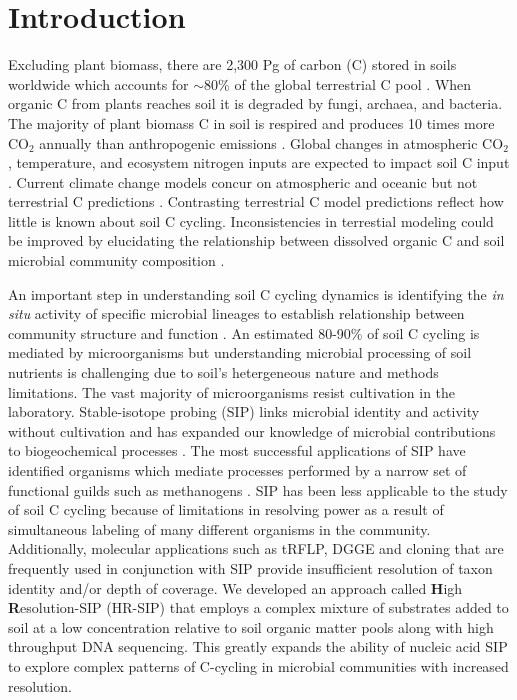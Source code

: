 \section{Introduction}
Excluding plant biomass, there are 2,300 Pg of carbon (C) stored in soils
worldwide which accounts for $\sim$80\% of the global terrestrial C pool
\citep{Amundson_2001,BATJES_1996}. When organic C from plants reaches soil it
is degraded by fungi, archaea, and bacteria.  The majority of plant biomass
C in soil is respired and produces 10 times more CO$_{2}$ annually than
anthropogenic emissions \citep{chapin2002principles}. Global
changes in atmospheric CO$_{2}$, temperature, and ecosystem nitrogen inputs are
expected to impact soil C input \citep{Groenigen_2006}. Current climate change
models concur on atmospheric and oceanic but not terrestrial C predictions
\citep{Friedlingstein_2006}. Contrasting terrestrial C model predictions
reflect how little is known about soil C cycling. Inconsistencies in
terrestial modeling could be improved by elucidating the relationship between
dissolved organic C and soil microbial community composition \citep{Neff_2001}.


An important step in understanding soil C cycling dynamics is identifying the
\textit{in situ} activity of specific microbial lineages to establish
relationship between community structure and function \citep{O_Donnell_2002}.
An estimated 80-90\% of soil C cycling is mediated by microorganisms
\citep{ColemanCrossley_1996,Nannipieri_2003} but understanding microbial
processing of soil nutrients is challenging due to soil's hetergeneous nature
and methods limitations. The vast majority of microorganisms resist cultivation
in the laboratory. Stable-isotope probing (SIP) links microbial identity and
activity without cultivation and has expanded our knowledge of microbial
contributions to biogeochemical processes \citep{Chen_Murrell_2010}. The most
successful applications of SIP have identified organisms which mediate
processes performed by a narrow set of functional guilds such as methanogens
\citep{Lu_2005}. SIP has been less applicable to the study of soil C cycling
because of limitations in resolving power as a result of simultaneous labeling
of many different organisms in the community. Additionally, molecular
applications such as tRFLP, DGGE and cloning that are frequently used in
conjunction with SIP provide insufficient resolution of taxon identity and/or
depth of coverage. We developed an approach called \textbf{H}igh
\textbf{R}esolution-SIP (HR-SIP) that employs a complex mixture of substrates
added to soil at a low concentration relative to soil organic matter pools
along with high throughput DNA sequencing. This greatly expands the ability of
nucleic acid SIP to explore complex patterns of C-cycling in microbial
communities with increased
resolution.

